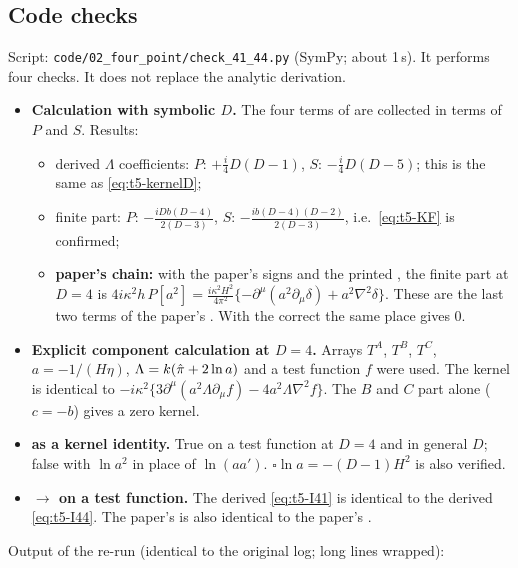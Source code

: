 \subsection{Code checks \texorpdfstring{\tC}{}}\label{sec:t5-code}
Script: \texttt{code/02\_four\_point/check\_41\_44.py} (SymPy; about 1\,s). It performs four
checks. It does not replace the analytic derivation.
\begin{itemize}
\item[(A)] \textbf{Calculation with symbolic \(D\).} The four terms of  are collected in
terms of \(P\) and \(S\). Results:
\begin{itemize}[nosep]
\item derived \(\Lambda\) coefficients: \(P\): \(+\tfrac i4D(D-1)\), \(S\): \(-\tfrac i4D(D-5)\); this is the
same as \eqref{eq:t5-kernelD};
\item finite part: \(P\): \(-\tfrac{iDb(D-4)}{2(D-3)}\), \(S\): \(-\tfrac{ib(D-4)(D-2)}{2(D-3)}\), i.e.\
\eqref{eq:t5-KF} is confirmed;
\item \textbf{paper's chain:} with the paper's  signs and the printed , the finite
part at \(D=4\) is \(4i\kappa^2h\,P[a^2]=\tfrac{i\kappa^2H^2}{4\pi^2}\{-\partial^\mu(a^2\partial_\mu\delta)+a^2\nabla^2\delta\}\).
These are the last two terms of the paper's \eqI{41}. With the correct \eqI{40} the same place
gives \(0\).
\end{itemize}
\item[(B)] \textbf{Explicit component calculation at \(D=4\).} Arrays \(T^A\), \(T^B\), \(T^C\),
\(a=-1/(H\eta)\), \(\Lambda=k(\hat\pi+2\ln a)\) and a test function \(f\) were used. The kernel is
identical to \(-i\kappa^2\{3\partial^\mu(a^2\Lambda\partial_\mu f)-4a^2\Lambda\nabla^2f\}\). The \(B\) and \(C\)
part alone (\(c=-b\)) gives a zero kernel.
\item[(C)] \textbf{ as a kernel identity.} True on a test function at \(D=4\) and in general
\(D\); false with \(\ln a^2\) in place of \(\ln(aa')\). \(\square\ln a=-(D-1)H^2\) is also verified.
\item[(D)] \textbf{\(\to\) on a test function.} The derived \eqref{eq:t5-I41} is
identical to the derived \eqref{eq:t5-I44}. The paper's \eqI{41} is also identical to the paper's
\eqI{44}.
\end{itemize}
Output of the re-run (identical to the original log; long lines wrapped):
\begingroup\scriptsize
